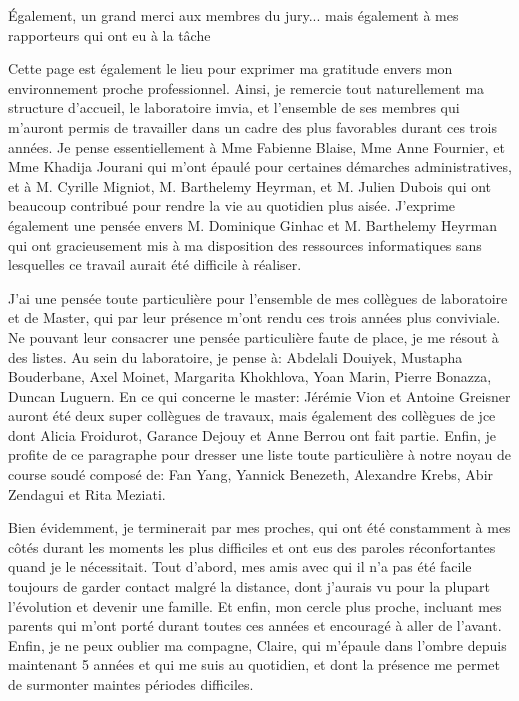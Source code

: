 \documentclass[english,standardlists]{spimubphdthesis}
\begin{document}
Également, un grand merci aux membres du jury... mais également à mes rapporteurs qui ont eu à la tâche\par

Cette page est également le lieu pour exprimer ma gratitude envers mon environnement proche professionnel. Ainsi, je remercie tout naturellement ma structure d'accueil, le laboratoire \gls{imvia}, et l'ensemble de ses membres qui m'auront permis de travailler dans un cadre des plus favorables durant ces trois années. Je pense essentiellement à Mme Fabienne Blaise, Mme Anne Fournier, et Mme Khadija Jourani qui m'ont épaulé pour certaines démarches administratives, et à M. Cyrille Migniot, M. Barthelemy Heyrman, et M. Julien Dubois qui ont beaucoup contribué pour rendre la vie au quotidien plus aisée. J'exprime également une pensée envers M. Dominique Ginhac et M. Barthelemy Heyrman qui ont gracieusement mis à ma disposition des ressources informatiques sans lesquelles ce travail aurait été difficile à réaliser.\par

J'ai une pensée toute particulière pour l'ensemble de mes collègues de laboratoire et de Master, qui par leur présence m'ont rendu ces trois années plus conviviale. Ne pouvant leur consacrer une pensée particulière faute de place, je me résout à des listes. Au sein du laboratoire, je pense à: Abdelali Douiyek, Mustapha Bouderbane, Axel Moinet, Margarita Khokhlova, Yoan Marin, Pierre Bonazza, Duncan Luguern. En ce qui concerne le master: Jérémie Vion et Antoine Greisner auront été deux super collègues de travaux, mais également des collègues de \gls{jce} dont Alicia Froidurot, Garance Dejouy et Anne Berrou ont fait partie. Enfin, je profite de ce paragraphe pour dresser une liste toute particulière à notre noyau de course soudé composé de: Fan Yang, Yannick Benezeth, Alexandre Krebs, Abir Zendagui et Rita Meziati.\par

Bien évidemment, je terminerait par mes proches, qui ont été constamment à mes côtés durant les moments les plus difficiles et ont eus des paroles réconfortantes quand je le nécessitait. Tout d'abord, mes amis avec qui il n'a pas été facile toujours de garder contact malgré la distance, dont j'aurais vu pour la plupart l'évolution et devenir une famille. Et enfin, mon cercle plus proche, incluant mes parents qui m'ont porté durant toutes ces années et encouragé à aller de l'avant. Enfin, je ne peux oublier ma compagne, Claire, qui m'épaule dans l'ombre depuis maintenant 5 années et qui me suis au quotidien, et dont la présence me permet de surmonter maintes périodes difficiles.\par
		
\end{document}
